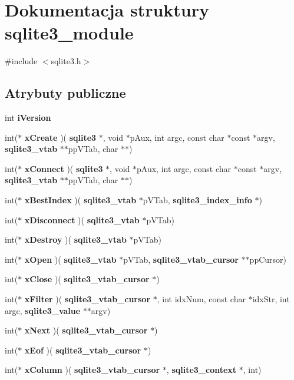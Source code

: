 \section{Dokumentacja struktury sqlite3\+\_\+module}
\label{structsqlite3__module}


{\ttfamily \#include $<$sqlite3.\+h$>$}

\subsection*{Atrybuty publiczne}
\begin{DoxyCompactItemize}
\item 
int \textbf{ i\+Version}
\item 
int($\ast$ \textbf{ x\+Create} )(\textbf{ sqlite3} $\ast$, void $\ast$p\+Aux, int argc, const char $\ast$const $\ast$argv, \textbf{ sqlite3\+\_\+vtab} $\ast$$\ast$pp\+V\+Tab, char $\ast$$\ast$)
\item 
int($\ast$ \textbf{ x\+Connect} )(\textbf{ sqlite3} $\ast$, void $\ast$p\+Aux, int argc, const char $\ast$const $\ast$argv, \textbf{ sqlite3\+\_\+vtab} $\ast$$\ast$pp\+V\+Tab, char $\ast$$\ast$)
\item 
int($\ast$ \textbf{ x\+Best\+Index} )(\textbf{ sqlite3\+\_\+vtab} $\ast$p\+V\+Tab, \textbf{ sqlite3\+\_\+index\+\_\+info} $\ast$)
\item 
int($\ast$ \textbf{ x\+Disconnect} )(\textbf{ sqlite3\+\_\+vtab} $\ast$p\+V\+Tab)
\item 
int($\ast$ \textbf{ x\+Destroy} )(\textbf{ sqlite3\+\_\+vtab} $\ast$p\+V\+Tab)
\item 
int($\ast$ \textbf{ x\+Open} )(\textbf{ sqlite3\+\_\+vtab} $\ast$p\+V\+Tab, \textbf{ sqlite3\+\_\+vtab\+\_\+cursor} $\ast$$\ast$pp\+Cursor)
\item 
int($\ast$ \textbf{ x\+Close} )(\textbf{ sqlite3\+\_\+vtab\+\_\+cursor} $\ast$)
\item 
int($\ast$ \textbf{ x\+Filter} )(\textbf{ sqlite3\+\_\+vtab\+\_\+cursor} $\ast$, int idx\+Num, const char $\ast$idx\+Str, int argc, \textbf{ sqlite3\+\_\+value} $\ast$$\ast$argv)
\item 
int($\ast$ \textbf{ x\+Next} )(\textbf{ sqlite3\+\_\+vtab\+\_\+cursor} $\ast$)
\item 
int($\ast$ \textbf{ x\+Eof} )(\textbf{ sqlite3\+\_\+vtab\+\_\+cursor} $\ast$)
\item 
int($\ast$ \textbf{ x\+Column} )(\textbf{ sqlite3\+\_\+vtab\+\_\+cursor} $\ast$, \textbf{ sqlite3\+\_\+context} $\ast$, int)

\end{DoxyCompactItemize}
